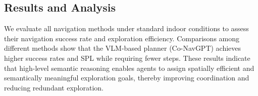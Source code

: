 \subsection{Results and Analysis}





We evaluate all navigation methods under standard indoor conditions to assess their navigation success rate and exploration efficiency. Comparisons among different methods show that the VLM-based planner (Co-NavGPT) achieves higher success rates and SPL while requiring fewer steps. These results indicate that high-level semantic reasoning enables agents to assign spatially efficient and semantically meaningful exploration goals, thereby improving coordination and reducing redundant exploration.

